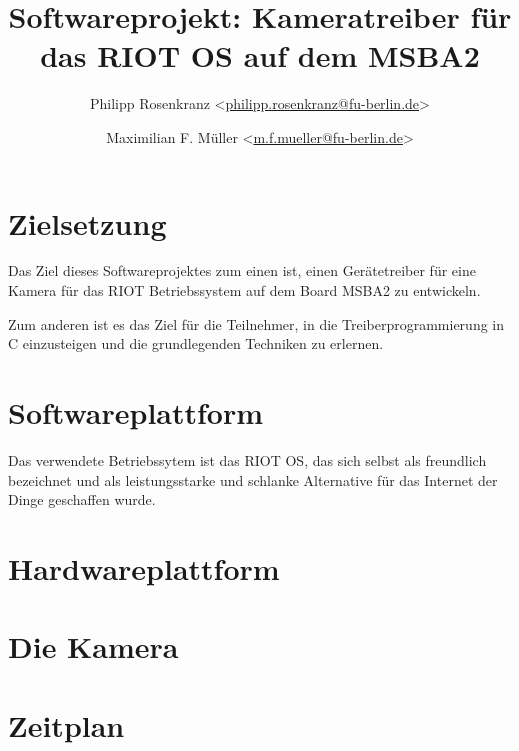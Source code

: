 \documentclass[10pt,a4paper]{article}
\title{Softwareprojekt: Kameratreiber für das RIOT OS auf dem MSBA2}
\author{Philipp Rosenkranz  \textless\href{mailto:philipp.rosenkranz@fu-berlin.de}{philipp.rosenkranz@fu-berlin.de}\textgreater
        \and Maximilian F. Müller \textless\href{mailto:m.f.mueller@fu-berlin.de}{m.f.mueller@fu-berlin.de}\textgreater}
\begin{document}
\maketitle

\section{Zielsetzung}

Das Ziel dieses Softwareprojektes zum einen ist, einen Gerätetreiber für eine Kamera
für das RIOT Betriebssystem auf dem Board MSBA2 zu entwickeln.

Zum anderen ist es das Ziel für die Teilnehmer, in die Treiberprogrammierung in C
einzusteigen und die grundlegenden Techniken zu erlernen.

\section{Softwareplattform}

Das verwendete Betriebssytem ist das RIOT OS, das sich selbst als freundlich bezeichnet
und als leistungsstarke und schlanke Alternative für das Internet der Dinge geschaffen
wurde.

\section{Hardwareplattform}

\section{Die Kamera}

\section{Zeitplan}
\end{document}

